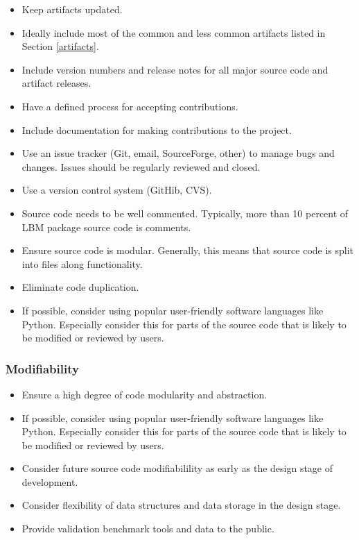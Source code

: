 \documentclass[12pt, notitlepage]{article}
\begin{document}
\begin{itemize}
	\item Keep artifacts updated.
	\item Ideally include most of the common and less common artifacts listed in Section \ref{artifacts}.
	\item Include version numbers and release notes for all major source code and artifact releases. 
	\item Have a defined process for accepting contributions.
	\item Include documentation for making contributions to the project. 
	\item Use an issue tracker (Git, email, SourceForge, other) to manage bugs and changes. Issues should be regularly reviewed and closed. 
	\item Use a version control system (GitHib, CVS).
	\item Source code needs to be well commented. Typically, more than 10 percent of LBM package source code is comments. 
	\item Ensure source code is modular. Generally, this means that source code is split into files along functionality.
	\item Eliminate code duplication.
	\item If possible, consider using popular user-friendly software languages like Python. Especially consider this for parts of the source code that is likely to be modified or reviewed by users.
\end{itemize}

\subsubsection{Modifiability}

\begin{itemize}
	\item Ensure a high degree of code modularity and abstraction.
	\item If possible, consider using popular user-friendly software languages like Python. Especially consider this for parts of the source code that is likely to be modified or reviewed by users.
	\item Consider future source code modifiabilility as early as the design stage of development.
	\item Consider flexibility of data structures and data storage in the design stage.
	\item Provide validation benchmark tools and data to the public.
\end{itemize}
\end{document}
